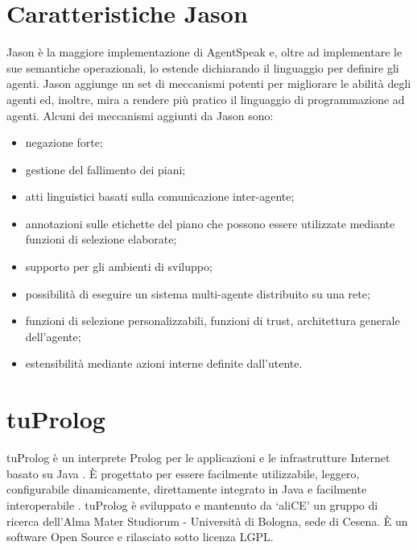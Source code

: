 \section{Caratteristiche Jason}
Jason è la maggiore implementazione di AgentSpeak e, oltre ad implementare le sue semantiche operazionali, lo estende dichiarando il linguaggio per definire gli agenti. Jason aggiunge un set di meccanismi potenti per migliorare le abilità degli agenti ed, inoltre, mira a rendere più pratico il linguaggio di programmazione ad agenti. Alcuni dei meccanismi aggiunti da Jason sono:
\begin{itemize}
\item negazione forte;
\item gestione del fallimento dei piani;
\item atti linguistici basati sulla comunicazione inter-agente;
\item annotazioni sulle etichette del piano che possono essere utilizzate mediante funzioni di selezione elaborate;
\item supporto per gli ambienti di sviluppo;
\item possibilità di eseguire un sistema multi-agente distribuito su una rete;
\item funzioni di selezione personalizzabili, funzioni di trust, architettura generale dell'agente;
\item estensibilità mediante azioni interne definite dall'utente.
\end{itemize}

\section{tuProlog}
tuProlog è un interprete Prolog per le applicazioni e le infrastrutture Internet basato su Java \cite{tuprolog-multi-paradigm}. È progettato per essere facilmente utilizzabile, leggero, configurabile dinamicamente, direttamente integrato in Java e facilmente interoperabile \cite{2p-alpnews2013}.
tuProlog è sviluppato e mantenuto da `aliCE' un gruppo di ricerca dell'Alma Mater Studiorum - Università di Bologna, sede di Cesena. È un software Open Source e rilasciato sotto licenza LGPL.

